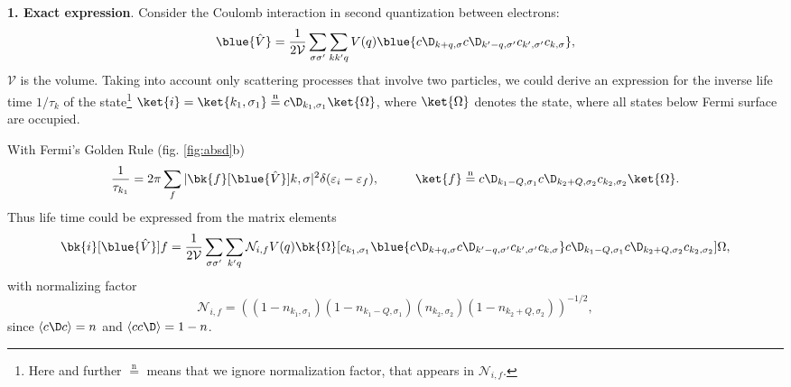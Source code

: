 

\textbf{1. Exact expression}.
Consider the Coulomb interaction in second quantization between electrons:
\begin{equation*}
	\blue{\hat{V}} = \frac{1}{2 \mathcal{V}} \sum_{\sigma \sigma'} \sum_{k k' q} V(q) 
	\blue{c\D_{k + q,\sigma} c\D_{k'-q,\sigma'} c_{k', \sigma'} c_{k, \sigma}},
\end{equation*}
$\mathcal{V}$ is the volume. Taking into account only scattering processes that involve two
particles, we could derive an expression for the inverse life time $1/ \tau_k$ of the state\footnote{
	Here and further $\overset{\mathrm{n}}{=}$ means that we ignore normalization factor, that appears in $\mathcal{N}_{i,f}$.
} $\ket{i} = \ket{k_1, \sigma_1} \overset{\mathrm{n}}{=}  c\D_{k_1, \sigma_1} \ket{\Omega}$, where $\ket{\Omega}$ denotes the state, where all states below Fermi surface are occupied. 


With Fermi's Golden Rule (fig. \ref{fig:absd}b)
\begin{equation*}
	\frac{1}{\tau_{k_1}} = 2 \pi \sum_{f} |\bk{f}[\blue{\hat{V}}]{k, \sigma}|^2 \delta(\varepsilon_i - \varepsilon_f),
	\hspace{10 mm}
	\ket{f} \overset{\mathrm{n}}{=}  c\D_{k_1-Q,\sigma_1} c\D_{k_2+Q,\sigma_2} c_{k_2,\sigma_2} \ket{\Omega}. 
\end{equation*}
Thus life time could be expressed from the matrix elements
\begin{equation*}
\bk{i} [\blue{\hat{V}}]{f} 
= 
\frac{1}{2 \mathcal{V}} \sum_{\sigma \sigma'} \sum_{k' q} \mathcal{N}_{i,f} V(q) 
	\bk{\Omega}[
		c_{k_1, \sigma_1}  
		\blue{c\D_{k + q,\sigma} c\D_{k'-q,\sigma'} c_{k', \sigma'} c_{k, \sigma}}   
		c\D_{k_1-Q,\sigma_1} c\D_{k_2+Q,\sigma_2} c_{k_2,\sigma_2}
	]{\Omega},
\end{equation*}
with normalizing factor 
\begin{equation*}
	\mathcal{N}_{i,f} = \left(
		(1- n_{k_1, \sigma_1})(1- n_{k_1-Q, \sigma_1}) (n_{k_2, \sigma_2})(1- n_{k_2+Q, \sigma_2})
	\right)^{-1/2},
\end{equation*}
since $\langle c\D c\rangle = n$ and $\langle c c\D\rangle = 1-n$.


